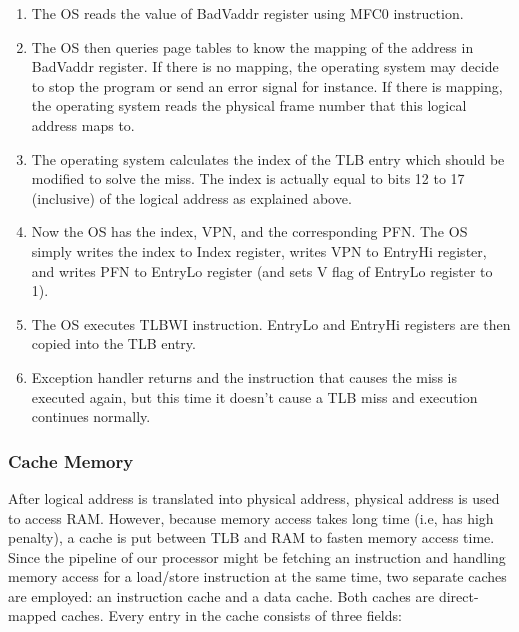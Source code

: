 \documentclass[oneside]{book}
\begin{document}
\begin{enumerate}

\item The OS reads the value of BadVaddr register using MFC0 instruction.

\item The OS then queries page tables to know the mapping of the address
      in BadVaddr register. If there is no mapping, the operating system
      may decide to stop the program or send an error signal for instance.
      If there is mapping, the operating system reads the physical
      frame number that this logical address maps to.

\item The operating system calculates the index of the TLB entry which
      should be modified to solve the miss. The index is actually
      equal to bits 12 to 17 (inclusive) of the logical address as
      explained above.

\item Now the OS has the index, VPN, and the corresponding PFN. The OS
      simply writes the index to Index register, writes VPN to EntryHi
      register, and writes PFN to EntryLo register (and sets V flag
      of EntryLo register to 1).

\item The OS executes TLBWI instruction. EntryLo and EntryHi registers
      are then copied into the TLB entry.

\item Exception handler returns and the instruction that causes the miss
      is executed again, but this time it doesn't cause a TLB miss and
      execution continues normally.

\end{enumerate}

\subsubsection{Cache Memory}

After logical address is translated into physical address, physical
address is used to access RAM. However, because memory access
takes long time (i.e, has high penalty), a cache is put
between TLB and RAM to fasten memory access time.\\

Since the pipeline of our processor might be fetching an instruction
and handling memory access for a load/store instruction at the same time,
two separate caches are employed: an instruction cache and a data cache.
Both caches are direct-mapped caches. Every entry in the cache consists of
three fields:
\end{document}
